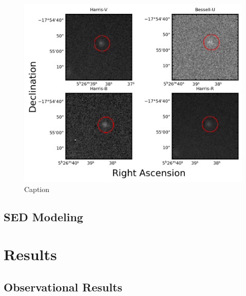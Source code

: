 \documentclass{aastex631}
\begin{document}
\begin{figure}
  \includegraphics[width=\textwidth]{../analysis/target-images.png}
  \caption{Caption}
  \label{fig:targ}
\end{figure}


\subsection{SED Modeling}

\section{Results}
\subsection{Observational Results}
\end{document}
